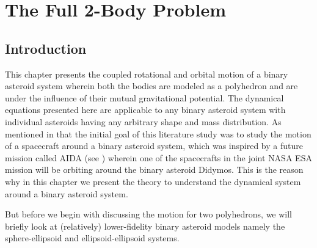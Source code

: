 \chapter{The Full 2-Body Problem}
\label{F2BP}
\graphicspath{{chapter-4/Images/}}

\section{Introduction}
This chapter presents the coupled rotational and orbital motion of a binary asteroid system wherein both the bodies are modeled as a polyhedron and are under the influence of their mutual gravitational potential. The dynamical equations presented here are applicable to any binary asteroid system with individual asteroids having any arbitrary shape and mass distribution. As mentioned in  that the initial goal of this literature study was to study the motion of a spacecraft around a binary asteroid system, which was inspired by a future mission called \gls{AIDA} (see ) wherein one of the spacecrafts in the joint \gls{NASA} \gls{ESA} mission will be orbiting around the binary asteroid Didymos. This is the reason why in this chapter we present the theory to understand the dynamical system around a binary asteroid system.

But before we begin with discussing the motion for two polyhedrons, we will briefly look at (relatively) lower-fidelity binary asteroid models namely the sphere-ellipsoid and ellipsoid-ellipsoid systems.


